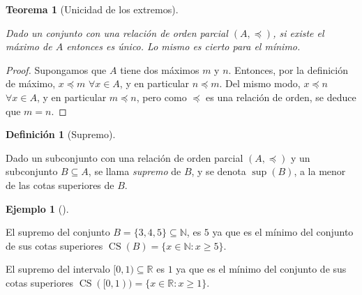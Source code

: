 \documentclass[
  a4paper,
]{scrreport}
\theoremstyle{definition}
\newtheorem{example}{Ejemplo}[chapter]
\theoremstyle{plain}
\theoremstyle{definition}
\newtheorem{definition}{Definición}[chapter]
\theoremstyle{definition}
\theoremstyle{plain}
\newtheorem{theorem}{Teorema}[chapter]
\theoremstyle{plain}
\theoremstyle{remark}
\begin{document}
\begin{theorem}[Unicidad de los
extremos]\protect\hypertarget{thm-unicidad-extremos}{}\label{thm-unicidad-extremos}

Dado un conjunto con una relación de orden parcial \((A,\preceq)\), si
existe el máximo de \(A\) entonces es único. Lo mismo es cierto para el
mínimo.

\end{theorem}

\begin{tcolorbox}[enhanced jigsaw, leftrule=.75mm, colbacktitle=quarto-callout-note-color!10!white, toprule=.15mm, opacityback=0, opacitybacktitle=0.6, toptitle=1mm, breakable, bottomtitle=1mm, colframe=quarto-callout-note-color-frame, rightrule=.15mm, titlerule=0mm, title=\textcolor{quarto-callout-note-color}{\faInfo}\hspace{0.5em}{Demostración}, arc=.35mm, left=2mm, bottomrule=.15mm, colback=white, coltitle=black]

\begin{proof}
Supongamos que \(A\) tiene dos máximos \(m\) y \(n\). Entonces, por la
definición de máximo, \(x\preceq m\) \(\forall x\in A\), y en particular
\(n\preceq m\). Del mismo modo, \(x\preceq n\) \(\forall x\in A\), y en
particular \(m\preceq n\), pero como \(\preceq\) es una relación de
orden, se deduce que \(m=n\).
\end{proof}

\end{tcolorbox}

\begin{definition}[Supremo]\protect\hypertarget{def-supremo-conjunto}{}\label{def-supremo-conjunto}

Dado un subconjunto con una relación de orden parcial \((A,\preceq)\) y
un subconjunto \(B\subseteq A\), se llama \emph{supremo} de \(B\), y se
denota \(\sup(B)\), a la menor de las cotas superiores de \(B\).

\end{definition}

\begin{example}[]\protect\hypertarget{exm-supremo}{}\label{exm-supremo}

El supremo del conjunto \(B=\{3, 4, 5\}\subseteq \mathbb{N}\), es \(5\)
ya que es el mínimo del conjunto de sus cotas superiores
\(\operatorname{CS}(B)=\{x\in \mathbb{N}:x\geq 5\}\).

El supremo del intervalo \([0,1)\subseteq \mathbb{R}\) es \(1\) ya que
es el mínimo del conjunto de sus cotas superiores
\(\operatorname{CS}([0,1)) = \{x\in \mathbb{R}:x\geq 1\}\).

\end{example}
\end{document}
